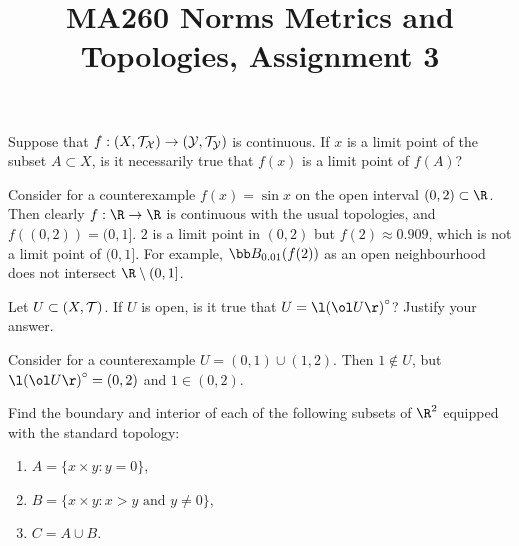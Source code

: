 \documentclass[a4paper]{article}
\title{MA260 Norms Metrics and Topologies, Assignment 3}
\begin{document}
\maketitle

\setlength{\parindent}{0em}
\setlength{\parskip}{1em}


\begin{questionbody}
Suppose that $f : (X, \cal T_X) \to (Y, \cal T_Y)$ is continuous. If $x$ is a limit point of the subset $A \subset X$, is it necessarily true that $f(x)$ is a limit point of $f(A)$?
\end{questionbody}

Consider for a counterexample $f(x) = \sin x$ on the open interval $(0, 2) \subset \R$. Then clearly $f : \R \to \R$ is continuous with the usual topologies, and $f((0, 2)) = (0, 1]$. $2$ is a limit point in $(0, 2)$ but $f(2) \approx 0.909$, which is not a limit point of $(0, 1]$. For example, $\bb B_{0.01}(f(2))$ as an open neighbourhood does not intersect $\R \setminus (0, 1]$. %



\begin{questionbody}
Let $U \subset (X, \cal T)$. If $U$ is open, is it true that $U = {\l( \ol U \r)}^\circ$? Justify your answer.
\end{questionbody}

Consider for a counterexample $U = (0, 1) \cup (1, 2)$. Then $1 \notin U$, but ${\l( \ol U \r)}^\circ = (0, 2)$ and $1 \in (0, 2)$.



\begin{questionbody}
Find the boundary and interior of each of the following subsets of $\R^2$ equipped with the standard topology:
\begin{enumerate}[1.]
\item $A = \{x \times y : y = 0\}$,

\item $B = \{x \times y : x > y \text{ and } y \ne 0\}$,

\item $C = A \cup B$.
\end{enumerate}
\end{questionbody}

\end{document}
